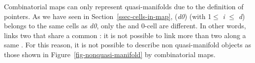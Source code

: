 Combinatorial maps can only represent quasi-manifolds due to the
definition of \betats{} pointers. As we have seen in
Section~\ref{ssec-cells-in-map}, \betai{}(\emph{d0}) (with 1$\leq$ \emph{i} $\leq$ \emph{d})
belongs to the same cells as \emph{d0}, only the  and 0-cell are
different. In other words, \betai{} links two  that
share a common : it is not possible to link more than two
 along a same .
%
%
For this reason, it is not possible to describe non quasi-manifold
objects as those shown in Figure~\ref{fig-nonquasi-manifold} by
combinatorial maps.
%
